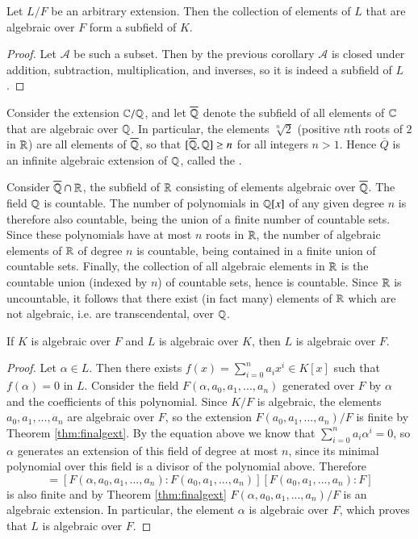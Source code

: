 \begin{corollary}
    Let $L/F$ be an arbitrary extension. Then the collection of elements of $L$ that are algebraic over $F$ form a subfield of $K$.
\end{corollary}
\begin{proof}
    Let $\mathcal{A}$ be such a subset. Then by the previous corollary $\mathcal{A}$ is closed under addition, subtraction, multiplication, and inverses, so it is indeed a subfield of $L$.
\end{proof}


\begin{example}
    Consider the extension $\mathbb C/\mathbb Q$, and let $\overline{\mathbb Q}$ denote the subfield of all elements of $\mathbb C$ that are algebraic over $\mathbb Q$. In particular, the elements $\sqrt[n]{2}$ (positive $n$th roots of $2$ in $\mathbb R$) are all elements of $\overline{\mathbb Q}$, so that $[\overline{\mathbb Q},\mathbb Q]\geq n$ for all integers $n > 1$. Hence $\overline{Q}$ is an infinite algebraic extension of $\mathbb Q$, called the .

    Consider $\overline{\mathbb Q}\cap \mathbb R$, the subfield of $\mathbb R$ consisting of elements algebraic over $\overline{\mathbb Q}$. The field $\mathbb Q$ is countable. The number of polynomials in $\mathbb Q[x]$ of any given degree $n$ is therefore also countable, being the union of a finite number of countable sets. Since these polynomials have at most $n$ roots in $\mathbb R$, the number of algebraic elements of $\mathbb R$ of degree $n$ is countable, being contained in a finite union of countable sets. Finally, the collection of all algebraic elements in $\mathbb R$ is the countable union (indexed by $n$) of countable sets, hence is countable. Since $\mathbb R$ is uncountable, it follows that there exist (in fact many) elements of $\mathbb R$ which are not algebraic, i.e. are transcendental, over $\mathbb Q$.
\end{example}


\begin{theorem}
    If $K$ is algebraic over $F$ and $L$ is algebraic over $K$, then $L$ is algebraic over $F$.
\end{theorem}
\begin{proof}
    Let $\alpha \in L$. Then there exists $f(x) = \sum_{i=0}^n a_ix^i \in K[x]$ such that $f(\alpha) = 0$ in $L$. Consider the field $F(\alpha,a_0,a_1,...,a_n)$ generated over $F$ by $\alpha$ and the coefficients of this polynomial. Since $K/F$ is algebraic, the elements $a_0,a_1,...,a_n$ are algebraic over $F$, so the extension $F(a_0,a_1,...,a_n)/F$ is finite by Theorem \ref{thm:finalgext}. By the equation above we know that $\sum_{i=0}^na_i\alpha^i = 0$, so $\alpha$ generates an extension of this field of degree at most $n$, since its minimal polynomial over this field is a divisor of the polynomial above. Therefore \begin{equation*}
        [F(\alpha,a_0,a_1,...,a_n):F] = [F(\alpha,a_0,a_1,...,a_n):F(a_0,a_1,...,a_n)][F(a_0,a_1,...,a_n):F]
    \end{equation*}
    is also finite and by Theorem \ref{thm:finalgext} $F(\alpha,a_0,a_1,...,a_n)/F$ is an algebraic extension. In particular, the element $\alpha$ is algebraic over $F$, which proves that $L$ is algebraic over $F$.
\end{proof}

